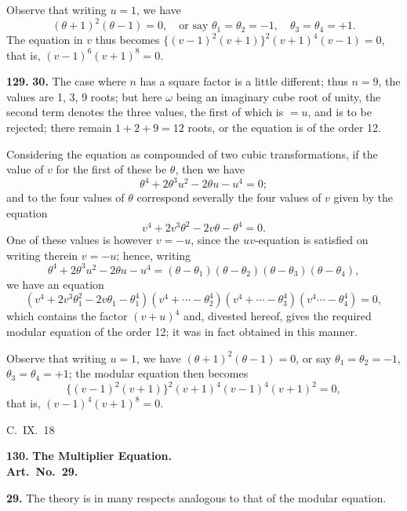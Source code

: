 \documentclass[11pt,a4paper]{book}
\begin{document}
Observe that writing $u = 1$, we have
\[
(\theta + 1)^2(\theta - 1) = 0, \quad \text{or say } \theta_1 = \theta_2 = -1, \quad \theta_3 = \theta_4 = +1.
\]
The equation in $v$ thus becomes $\{(v - 1)^2(v + 1)\}^2(v + 1)^4(v - 1) = 0$, that is, $(v - 1)^6(v + 1)^8 = 0$.


\noindent\textbf{129.} \textbf{30.} The case where $n$ has a square factor is a little different; thus $n = 9$, the values are 1, 3, 9 roots; but here $\omega$ being an imaginary cube root of unity, the second term denotes the three values, the first of which is $= u$, and is to be rejected; there remain $1 + 2 + 9 = 12$ roots, or the equation is of the order 12.

Considering the equation as compounded of two cubic transformations, if the value of $v$ for the first of these be $\theta$, then we have
\[
\theta^4 + 2\theta^3u^2 - 2\theta u - u^4 = 0;
\]
and to the four values of $\theta$ correspond severally the four values of $v$ given by the equation
\[
v^4 + 2v^3\theta^2 - 2v\theta - \theta^4 = 0.
\]
One of these values is however $v = -u$, since the $uv$-equation is satisfied on writing therein $v = -u$; hence, writing
\[
\theta^4 + 2\theta^3u^2 - 2\theta u - u^4 = (\theta - \theta_1)(\theta - \theta_2)(\theta - \theta_3)(\theta - \theta_4),
\]
we have an equation
\[
(v^4 + 2v^3\theta_1^2 - 2v\theta_1 - \theta_1^4)(v^4 + \cdots - \theta_2^4)(v^4 + \cdots - \theta_3^4)(v^4 \cdots - \theta_4^4) = 0,
\]
which contains the factor $(v + u)^4$ and, divested hereof, gives the required modular equation of the order 12; it was in fact obtained in this manner.

Observe that writing $u = 1$, we have $(\theta + 1)^2(\theta - 1) = 0$, or say $\theta_1 = \theta_2 = -1$, $\theta_3 = \theta_4 = +1$; the modular equation then becomes
\[
\{(v - 1)^2(v + 1)\}^2(v + 1)^4(v - 1)^4(v + 1)^2 = 0,
\]
that is, $(v - 1)^4(v + 1)^8 = 0$.

\begin{flushright}
C.~IX.~18
\end{flushright}


\noindent\textbf{130.} \textbf{The Multiplier Equation.}\\
\textbf{Art.~No.~29.}

\medskip
\noindent\textbf{29.} The theory is in many respects analogous to that of the modular equation.
\end{document}
